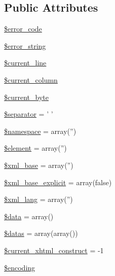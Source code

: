 \subsection*{Public Attributes}
\begin{DoxyCompactItemize}
\item 
\hyperlink{class_simple_pie___parser_a881e719d1b71555316a0188209baf145}{\$error\-\_\-code}
\item 
\hyperlink{class_simple_pie___parser_a557b4ad09f482e9ff3de340ca260c695}{\$error\-\_\-string}
\item 
\hyperlink{class_simple_pie___parser_afcee171a99e2c778b3b48c75093fcb43}{\$current\-\_\-line}
\item 
\hyperlink{class_simple_pie___parser_a7ef992c4fddf60201d0a26e9e2cf9f41}{\$current\-\_\-column}
\item 
\hyperlink{class_simple_pie___parser_ac04dc0fe946a71a8a84e7d78b198f239}{\$current\-\_\-byte}
\item 
\hyperlink{class_simple_pie___parser_a23eb2326d735d23e386606ecd7e936cb}{\$separator} = ' '
\item 
\hyperlink{class_simple_pie___parser_aaf108d6ea33bf787a0681c91170da77e}{\$namespace} = array('')
\item 
\hyperlink{class_simple_pie___parser_a9c6c1ded4262e56990c6222eccbcaa40}{\$element} = array('')
\item 
\hyperlink{class_simple_pie___parser_af80a4ce156bfb4da6041bfb8882b88c9}{\$xml\-\_\-base} = array('')
\item 
\hyperlink{class_simple_pie___parser_ae6d2d612ae4e8248277505fd10c6ad8f}{\$xml\-\_\-base\-\_\-explicit} = array(false)
\item 
\hyperlink{class_simple_pie___parser_abe93880463a69f025fbba6298f521174}{\$xml\-\_\-lang} = array('')
\item 
\hyperlink{class_simple_pie___parser_a61ec374ffe7f317a452aa1cfd2c58a7a}{\$data} = array()
\item 
\hyperlink{class_simple_pie___parser_ac06916961f0f2c6d6d19c7e001ab29d8}{\$datas} = array(array())
\item 
\hyperlink{class_simple_pie___parser_a84f446493f5def8fa688fed79d23f53f}{\$current\-\_\-xhtml\-\_\-construct} = -\/1
\item 
\hyperlink{class_simple_pie___parser_af2e01fec8b28a7b619abab469893b358}{\$encoding}
\end{DoxyCompactItemize}


